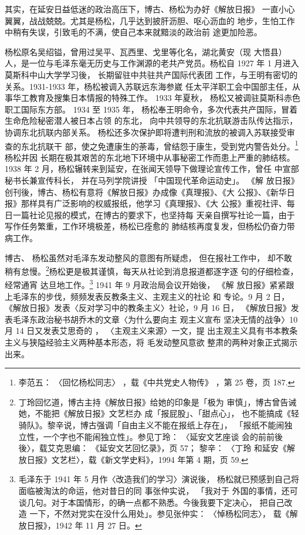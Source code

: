 其实，在延安日益低迷的政治高压下，博古、杨松为办好《解放日报》
一直小心翼翼，战战兢兢。尤其是杨松，几乎达到披肝沥胆、呕心沥血的
地步，生怕工作中稍有失误，引致毛的不满，使自己本来就黯淡的政治前
途更加险恶。

杨松原名吴绍镒，曾用过吴平、瓦西里、戈里等化名，湖北黄安（现
大悟县）人，是一位与毛泽东毫无历史与工作渊源的老共产党员。杨松自
1927 年 1 月进入莫斯科中山大学学习後，
长期留驻中共驻共产国际代表团
工作，与王明有密切的关系。1931-1933 年，杨松被调入苏联远东海参崴
任太平洋职工会中国部主任，从事华工教育及搜集日本情报的特殊工作。
1933 年夏秋，
杨松又被调驻莫斯科赤色职工国际东方部。
1934 至 1935 年，
杨松奉王明命令，多次代表共产国际，冒着生命危险秘密潜人被日本占领
的东北，
向中共领导的东北抗联游击队传达指示，
协调东北抗联内部关系。
杨松还多次保护即将遭判刑和流放的被调入苏联接受审查的东北抗联干
部，使之免遭康生的荼毒，曾结怨于康生，受到党内警告处分。\footnote{李范五：
〈回忆杨松同志〉
，载《中共党史人物传》
，第 25 卷，页 187.}杨松并因
长期在极其艰苦的东北地下环境中从事秘密工作而患上严重的肺结核。
1938 年 2 月，杨松辗转来到延安，在张闻天领导下做理论宣传工作，曾任
中宣部秘书长兼宣传科长，
并在马列学院讲授
「中国现代革命运动史」。
《解
放日报》创刊後，博古、杨松有意将《解放日报》办成像《真理报》、《大
公报》、《新华日报》那样具有广泛影响的权威报纸，他学习《真理报》、《大
公报》重视社评、每日一篇社论见报的模式，在博古的要求下，也坚持每
天亲自撰写社论一篇，由于写作任务繁重，工作环境极差，杨松已痊愈的
肺结核再度复发，但杨松仍奋力带病工作。

博古、 杨松虽然对毛泽东发动整风的意图有所疑虑， 但在报社工作中， 却不敢
稍有怠慢。\footnote{丁玲回忆道，博古主持《解放日报》给她的印象是「极为
审慎」，博古曾告诫她，不能把《解放日报》文艺栏办 成「报屁股」、「甜点心」，
也不能搞成《轻骑队》。黎辛说，博古强调「自由主义不能在报纸上存在」，
「报纸不能闹独 立性，一个字也不能闹独立性」。参见丁玲： 〈延安文艺座谈
会的前前後後〉，载艾克恩编： 《延安文艺回忆录》，页 57； 黎辛： 〈丁玲
和延安《解放日报》文艺栏〉，载《新文学史料》，1994 年第 4 期，页 59.
}杨松更是极其谨慎，每天从社论到消息报道都逐字逐 句的仔细检查， 经常通宵
达旦地工作。\footnote{毛泽东于 1941 年 5 月作〈改造我们的学习〉演说後，
杨松就已预感到自己将面临被淘汰的命运，他对昔日的同 事张仲实说， 「我对于
外国的事情，还可谈几句。对于本国情形，的确一点都不熟悉。今後我要下定决心，
把自己改造 一下，不然对党实在没什么用处」。参见张仲实： 〈悼杨松同志〉，
载《解放日报》，1942 年 11 月 27 日。} 1941 年 9 月政治局会议开始後，
《解 放日报》紧紧跟上毛泽东的步伐，频频发表反教条主义、主观主义的社论 和
专论。9 月 2 日， 《解放日报》发表〈反对学习中的教条主义〉社论，9 月 16
日， 《解放日报》发表毛泽东政治秘书胡乔木的文章〈为什么要向主 观主义宣布
坚决无情的战争〉10 月 14 日又发表艾思奇的 ， 〈主观主义来源〉一文，提
出主观主义具有书本教条主义与狭隘经验主义两种基本形态，将 毛发动整风意欲
整肃的两种对象正式揭示出来。

